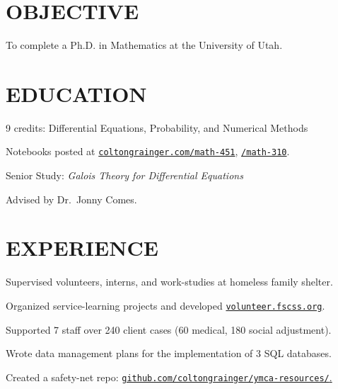 \documentclass[margin]{res}
\begin{document}
\begin{resume}

\printheader
\section{OBJECTIVE}

To complete a Ph.D. in Mathematics at the University of Utah.

\section{EDUCATION}

\begin{details}
\item 9 credits: Differential Equations, Probability, and Numerical Methods
\item Notebooks posted at \href{http://coltongrainger.com/math-451}{\texttt{coltongrainger.com/math-451}}, \href{http://coltongrainger.com/math-310}{\texttt{/math-310}}.
\end{details}

\begin{details}
\item Senior Study: \emph{Galois Theory for Differential Equations}
\item Advised by Dr.~Jonny Comes.
\end{details}

\section{EXPERIENCE}

\begin{details}
\item{Supervised volunteers, interns, and work-studies at homeless family shelter.}
\item{Organized service-learning projects and developed \href{http://volunteer.fscss.org}{\texttt{volunteer.fscss.org}}.}
\end{details}

\begin{details}
\item{Supported 7 staff over 240 client cases (60 medical, 180 social adjustment).}
\item{Wrote data management plans for the implementation of 3 SQL databases.}
\item{Created a safety-net repo: \href{https://github.com/coltongrainger/ymca-resources/}{\texttt{github.com/coltongrainger/ymca-resources/}.}}
\end{details}


\end{resume}
\end{document}
